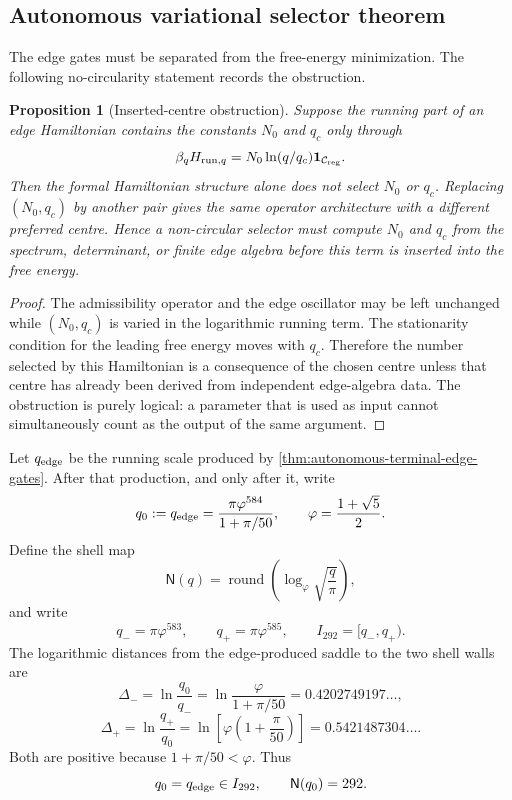 \documentclass[aps,prd,reprint,nofootinbib,superscriptaddress,floatfix]{revtex4-2}
\numberwithin{equation}{section}
\theoremstyle{definition}
\theoremstyle{plain}
\newtheorem{proposition}{Proposition}[section]
\begin{document}
\subsection{Autonomous variational selector theorem}

The edge gates must be separated from the free-energy minimization.  The
following no-circularity statement records the obstruction.

\begin{proposition}[Inserted-centre obstruction]
\label{prop:inserted-centre-obstruction}
Suppose the running part of an edge Hamiltonian contains the constants
\(N_0\) and \(q_c\) only through
\[
\beta_q H_{{\rm run},q}
=
N_0\ln(q/q_c)\mathbf 1_{\mathcal C_{\rm reg}} .
\]
Then the formal Hamiltonian structure alone does not select \(N_0\) or \(q_c\).
Replacing \((N_0,q_c)\) by another pair gives the same operator architecture
with a different preferred centre.  Hence a non-circular selector must compute
\(N_0\) and \(q_c\) from the spectrum, determinant, or finite edge algebra
before this term is inserted into the free energy.
\end{proposition}

\begin{proof}
The admissibility operator and the edge oscillator may be left unchanged while
\((N_0,q_c)\) is varied in the logarithmic running term.  The stationarity
condition for the leading free energy moves with \(q_c\).  Therefore the
number selected by this Hamiltonian is a consequence of the chosen centre
unless that centre has already been derived from independent edge-algebra
data.  The obstruction is purely logical: a parameter that is used as input
cannot simultaneously count as the output of the same argument.
\end{proof}

Let \(q_{\rm edge}\) be the running scale produced by
\cref{thm:autonomous-terminal-edge-gates}.  After that production, and only
after it, write
\[
q_0:=q_{\rm edge}
=
\frac{\pi\varphi^{584}}{1+\pi/50},
\qquad
\varphi=\frac{1+\sqrt5}{2}.
\]
Define the shell map
\[
\mathsf N(q)
=
\operatorname{round}
\left(
\log_\varphi\sqrt{\frac q\pi}
\right),
\]
and write
\[
q_-=\pi\varphi^{583},
\qquad
q_+=\pi\varphi^{585},
\qquad
I_{292}=[q_-,q_+).
\]
The logarithmic distances from the edge-produced saddle to the two shell walls
are
\[
\Delta_-=
\ln\frac{q_0}{q_-}
=
\ln\frac{\varphi}{1+\pi/50}
=
0.4202749197\ldots,
\]
\[
\Delta_+=
\ln\frac{q_+}{q_0}
=
\ln\!\left[\varphi\left(1+\frac{\pi}{50}\right)\right]
=
0.5421487304\ldots .
\]
Both are positive because \(1+\pi/50<\varphi\).  Thus
\[
q_0=q_{\rm edge}\in I_{292},
\qquad
\mathsf N(q_0)=292.
\]
\end{document}

